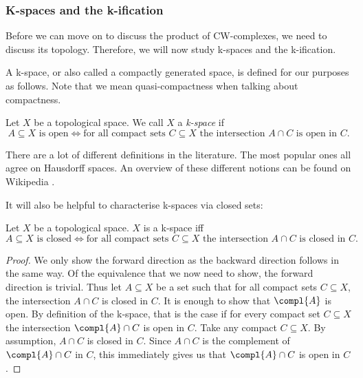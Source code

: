\subsubsection*{K-spaces and the k-ification}\label{sec:kspace}

Before we can move on to discuss the product of CW-complexes, we need to discuss its topology.
Therefore, we will now study k-spaces and the k-ification.

A k-space, or also called a compactly generated space, is defined for our purposes as follows. 
Note that we mean quasi-compactness when talking about compactness.

\begin{defi}
    Let $X$ be a topological space. 
    We call $X$ a \emph{k-space} if 
    \[A \subseteq X \text{ is open} \iff \text{for all compact sets } C \subseteq X \text{ the intersection } A \cap C \text{ is open in } C.\] \href{https://github.com/scholzhannah/CWComplexes/blob/7be4872a05b534011cc969eb5b80a4b7f0bf57e2/CWcomplexes/KSpace.lean#L33-L39}{\faExternalLink}
\end{defi}

There are a lot of different definitions in the literature. 
The most popular ones all agree on Hausdorff spaces. 
An overview of these different notions can be found on Wikipedia \cite{Wikipedia2024}.

It will also be helpful to characterise k-spaces via closed sets: 

\begin{lem}\label{lem:closediffinkspace}
    Let $X$ be a topological space.
    $X$ is a k-space iff  
    \[A \subseteq X \text{ is closed} \iff \text{for all compact sets } C \subseteq X \text{ the intersection } A \cap C \text{ is closed in } C.\] 
    \href{https://github.com/scholzhannah/CWComplexes/blob/7be4872a05b534011cc969eb5b80a4b7f0bf57e2/CWcomplexes/KSpace.lean#L43-L54}{\faExternalLink}
\end{lem}
\begin{proof}
    We only show the forward direction as the backward direction follows in the same way.
    Of the equivalence that we now need to show, the forward direction is trivial.
    Thus let $A \subseteq X$ be a set such that for all compact sets $C \subseteq X$, the intersection $A \cap C$ is closed in $C$. 
    It is enough to show that $\compl{A}$ is open. 
    By definition of the k-space, that is the case if for every compact set $C \subseteq X$ the intersection $\compl{A} \cap C$ is open in $C$. 
    Take any compact $C \subseteq X$.
    By assumption, $A \cap C$ is closed in $C$.
    Since $A \cap C$ is the complement of $\compl{A} \cap C$ in $C$, this immediately gives us that $\compl{A} \cap C$ is open in $C$.
\end{proof}

